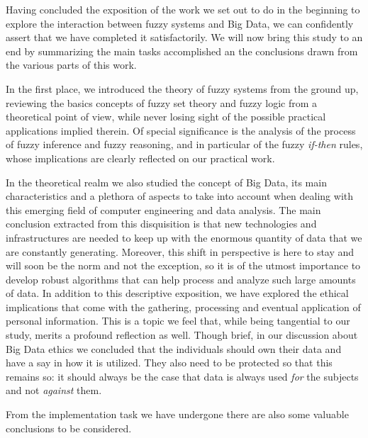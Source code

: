 %
%
%

Having concluded the exposition of the work we set out to do in the beginning to explore the interaction between fuzzy systems and Big Data, we can confidently assert that we have completed it satisfactorily. We will now bring this study to an end by summarizing the main tasks accomplished an the conclusions drawn from the various parts of this work.

In the first place, we introduced the theory of fuzzy systems from the ground up, reviewing the basics concepts of fuzzy set theory and fuzzy logic from a theoretical point of view, while never losing sight of the possible practical applications implied therein. Of special significance is the analysis of the process of fuzzy inference and fuzzy reasoning, and in particular of the fuzzy \textit{if-then} rules, whose implications are clearly reflected on our practical work.

In the theoretical realm we also studied the concept of Big Data, its main characteristics and a plethora of aspects to take into account when dealing with this emerging field of computer engineering and data analysis. The main conclusion extracted from this disquisition is that new technologies and infrastructures are needed to keep up with the enormous quantity of data that we are constantly generating. Moreover, this shift in perspective is here to stay and will soon be the norm and not the exception, so it is of the utmost importance to develop robust algorithms that can help process and analyze such large amounts of data. In addition to this descriptive exposition, we have explored the ethical implications that come with the gathering, processing and eventual application of personal information. This is a topic we feel that, while being tangential to our study, merits a profound reflection as well. Though brief, in our discussion about Big Data ethics we concluded that the individuals should own their data and have a say in how it is utilized. They also need to be protected so that this remains so: it should always be the case that data is always used \textit{for} the subjects and not \textit{against} them.

From the implementation task we have undergone there are also some valuable conclusions to be considered.

